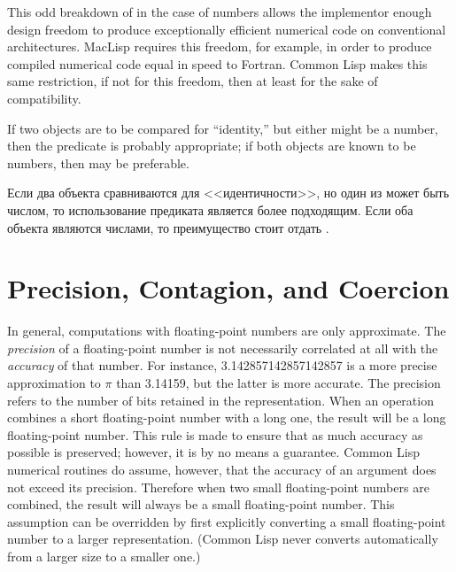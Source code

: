\beforenoterule
\begin{rationale}
This odd breakdown of  in the case of numbers
allows the implementor enough design freedom to produce exceptionally
efficient numerical code on conventional architectures.
MacLisp requires this freedom, for example, in order to produce compiled
numerical code equal in speed to Fortran.
Common Lisp makes this same restriction,
if not for this freedom, then at least for the sake of compatibility.
\end{rationale}
\afternoterule

If two objects are to be compared for ``identity,'' but either might be
a number, then the predicate  is probably appropriate;
if both objects are known to be numbers, then \cdf{=}
may be preferable.

Если два объекта сравниваются для <<идентичности>>, но один из может быть
числом, то использование предиката  является более подходящим.
Если оба объекта являются числами, то преимущество стоит отдать \cdf{=}.

\section{Precision, Contagion, and Coercion}
\label{PRECISION-CONTAGION-COERCION-SECTION}

In general,
computations with floating-point numbers are only approximate.
The \emph{precision} of a floating-point number is not necessarily
correlated at all with the \emph{accuracy} of that number.
For instance, 3.142857142857142857 is a more precise approximation
to $\pi$ than 3.14159, but the latter is more accurate.
The precision refers to the number of bits retained in the representation.
When an operation combines a short floating-point number with a long one,
the result will be a long floating-point number.  This rule is made
to ensure that as much accuracy as possible is preserved; however,
it is by no means a guarantee.
Common Lisp numerical routines do assume, however, that the accuracy of
an argument does not exceed its precision.  Therefore
when two small floating-point numbers
are combined, the result will always be a small floating-point number.
This assumption can be overridden by first explicitly converting
a small floating-point number to a larger representation.
(Common Lisp never converts automatically from a larger size to a smaller one.)

